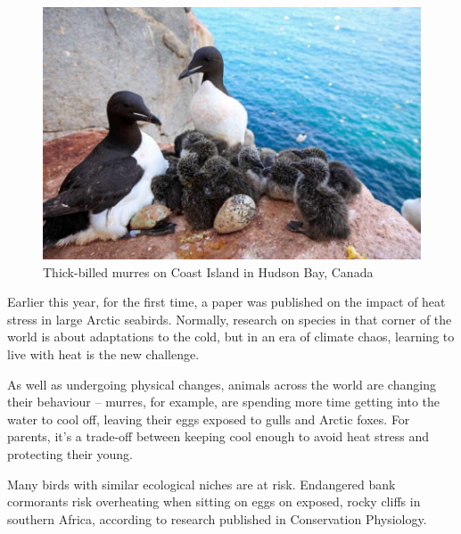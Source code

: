 \documentclass[12pt, a4paper]{article}
\begin{document}
\newpage
\begin{figure}
    \includegraphics[scale=0.25]{seabirds.jpg}
    \caption{Thick-billed murres on Coast Island in Hudson Bay, Canada}
    \label{fig:seabirds}
\end{figure}
Earlier this year, for the first time, a paper was published on the impact of heat stress in large Arctic seabirds. Normally, research on species in that corner of the world is about adaptations to the cold, but in an era of climate chaos, learning to live with heat is the new challenge.

As well as undergoing physical changes, animals across the world are changing their behaviour – murres, for example, are spending more time getting into the water to cool off, leaving their eggs exposed to gulls and Arctic foxes. For parents, it’s a trade-off between keeping cool enough to avoid heat stress and protecting their young.

Many birds with similar ecological niches are at risk. Endangered bank cormorants risk overheating when sitting on eggs on exposed, rocky cliffs in southern Africa, according to research published in Conservation Physiology.
\end{document}
